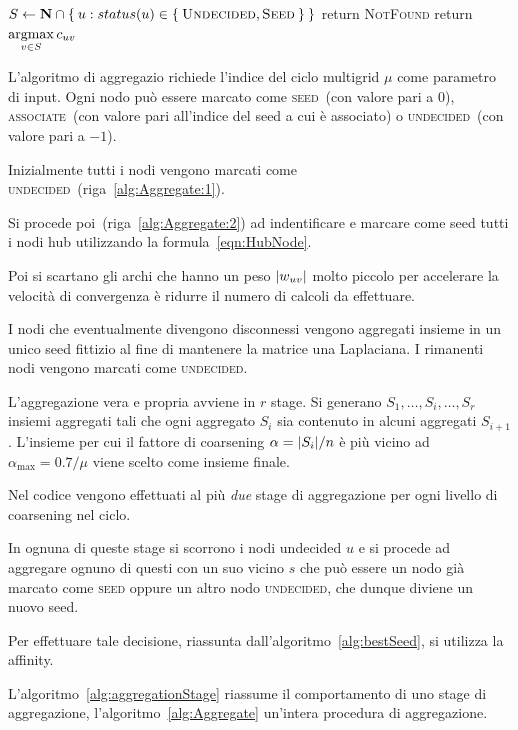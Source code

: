 \begin{algorithm}
\caption{$s \gets bestSeed(\A,\matr{X},aggregateSize,\matr{N},\matr{C},u)$}
\label{alg:bestSeed}
\begin{algorithmic}[1]
\State $S \gets \mathbf{N} \cap \Set{ u : status(u) \in \Set{ \textsc{Undecided}, \textsc{Seed} } }$
	\State return \textsc{NotFound}
\Else
	\State return $\underset{v \in S}{\operatorname{argmax}}\, c_{uv}$
\EndIf
\end{algorithmic}
\end{algorithm}
L'algoritmo di aggregazio richiede l'indice del ciclo multigrid $\mu$ come parametro di input.
Ogni nodo può essere marcato come \textsc{seed}~(con valore pari a $0$), \textsc{associate}~(con valore pari all'indice del seed a cui è associato) o \textsc{undecided}~(con valore pari a $-1$).

Inizialmente tutti i nodi vengono marcati come \textsc{undecided}~(riga~\ref{alg:Aggregate:1}). 

Si procede poi~(riga~\ref{alg:Aggregate:2}) ad indentificare e marcare come seed tutti i nodi hub utilizzando la formula~\eqref{eqn:HubNode}.

Poi si scartano gli archi che hanno un peso $\lvert w_{uv}\rvert$ molto piccolo per accelerare la velocità di convergenza è ridurre il numero di calcoli da effettuare.

I nodi che eventualmente divengono disconnessi vengono aggregati insieme in un unico seed fittizio al fine di mantenere la matrice una Laplaciana.
I rimanenti nodi vengono marcati come \textsc{undecided}.

L'aggregazione vera e propria avviene in $r$ stage. Si generano $S_1,\dots,S_i,\dots,S_r$ insiemi aggregati tali che ogni aggregato $S_i$ sia contenuto in alcuni aggregati $S_{i+1}$.
L'insieme per cui il fattore di coarsening $\alpha = \lvert S_i\rvert/n$ è più vicino ad $\alpha_{\max} = 0.7 / \mu$ viene scelto come insieme finale. 

Nel codice vengono effettuati al più \emph{due} stage di aggregazione per ogni livello di coarsening nel ciclo.

In ognuna di queste stage si scorrono i nodi undecided $u$ e si procede ad aggregare ognuno di questi con un suo vicino $s$ che può essere un nodo già marcato come \textsc{seed} oppure un altro nodo \textsc{undecided}, che dunque diviene un nuovo seed.

Per effettuare tale decisione, riassunta dall'algoritmo~\vref{alg:bestSeed}, si utilizza la affinity.

L'algoritmo~\vref{alg:aggregationStage} riassume il comportamento di uno stage di aggregazione, l'algoritmo~\vref{alg:Aggregate} un'intera procedura di aggregazione.


